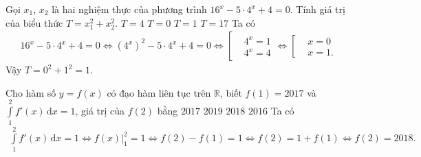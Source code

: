 \begin{ex}%
 Gọi $x_1$, $x_2$ là hai nghiệm thực của phương trình $16^x-5\cdot4^x+4=0$. Tính giá trị của biểu thức $T=x_1^2+x_2^2$.
 \choice
  {$T=4$}
  {$T=0$}
  {\True $T=1$}
  {$T=17$}
 \loigiai
  {
  Ta có
  \begin{eqnarray*}
   16^x-5\cdot 4^x+4=0 \Leftrightarrow (4^x)^2-5\cdot 4^x+4=0 \Leftrightarrow \left[\begin{aligned}&4^x=1 \\&4^x=4\end{aligned}\right. \Leftrightarrow \left[\begin{aligned}&x=0 \\&x=1.\end{aligned}\right.
  \end{eqnarray*}
  Vậy $T=0^2+1^2=1$.
  }
\end{ex}

\begin{ex}%
 Cho hàm số $y=f(x)$ có đạo hàm liên tục trên $\mathbb{R}$, biết $f(1)=2017$ và $\displaystyle\int\limits_1^2 f'(x)\mathrm{\,d}x=1$, giá trị của $f(2)$ bằng
 \choice
  {$2017$}
  {$2019$}
  {\True $2018$}
  {$2016$}
 \loigiai
  {
  Ta có
  \begin{eqnarray*}
   \displaystyle\int\limits_1^2 f'(x)\mathrm{\,d}x=1 \Leftrightarrow f(x)\bigg|_1^2=1 \Leftrightarrow f(2)-f(1)=1 \Leftrightarrow f(2)=1+f(1) \Leftrightarrow f(2)=2018.
  \end{eqnarray*}
  }
\end{ex}

